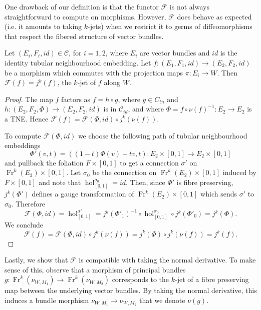 \documentclass[10pt]{amsart}
\newcommand{\F}{{\mathcal{F}}}
\newcommand{\hol}{{\operatorname{hol}}}
\newcommand{\Fr}{{\operatorname{Fr}}}
\newcommand{\C}{\mathcal{C}}
\numberwithin{theoremalpha}{section}
\numberwithin{equation}{section}
\numberwithin{definition}{section}
\numberwithin{theorem}{section}
\numberwithin{proposition}{section}
\numberwithin{lemma}{section}
\numberwithin{example}{section}
\numberwithin{remark}{section}
\numberwithin{corollary}{section}
\numberwithin{question}{section}
\numberwithin{problem}{section}
\numberwithin{assumption}{section}
\theoremstyle{named}
\numberwithin{equation}{section}
\begin{document}
One drawback of our definition is that the functor $\F$ is not always straightforward to compute on morphisms. However, $\F$ does behave as expected (i.e. it amounts to taking $k$-jets) when we restrict it to germs of diffeomorphisms that respect the fibered structure of vector bundles.
\begin{lemma} \label{holonomycomputation}
Let $(E_{i}, F_{i}, id) \in \mathcal{C}$, for $i = 1, 2$, where $E_{i}$ are vector bundles and $id$ is the identity tubular neighbourhood embedding. Let $f: (E_{1}, F_{1}, id) \to (E_{2}, F_{2}, id)$ be a morphism which commutes with the projection maps $\pi: E_{i} \to W$. Then $\F(f) = j^{k}(f)$, the $k$-jet of $f$ along $W$. 
\end{lemma}
\begin{proof}
The map $f$ factors as $f = h \circ g$, where $g \in C_{tn}$ and $h : (E_2, F_{2}, \Phi) \to (E_2, F_{2}, id)$ is in $\C_{id}$, and where $\Phi = f \circ \nu(f)^{-1} : E_2 \to E_2$ is a TNE. Hence $\F(f) = \F(\Phi, id) \circ j^{k}(\nu(f))$. 

To compute $\F(\Phi, id)$ we choose the following path of tubular neighbourhood embeddings 
\[
\Phi'(v, t) = ((1-t)\Phi(v) + tv, t) : E_{2} \times [0,1] \to E_2 \times [0,1]
\]
and pullback the foliation $F \times [0,1]$ to get a connection $\sigma'$ on $\Fr^{k}(E_{2}) \times [0,1]$. Let $\sigma_0$ be the connection on $\Fr^{k}(E_{2}) \times [0,1]$ induced by $F \times [0,1]$ and note that $\hol^{\sigma_0}_{[0,1]} = id$. Then, since $\Phi'$ is fibre preserving, $j^{k}(\Phi')$ defines a gauge transformation of $\Fr^{k}(E_{2}) \times [0,1]$ which sends $\sigma'$ to $\sigma_{0}$. Therefore 
\[
\F(\Phi, id) = \hol_{[0,1]}^{\sigma'} = j^{k}(\Phi'_{1})^{-1} \circ \hol^{\sigma_0}_{[0,1]} \circ j^{k}(\Phi'_{0}) = j^k(\Phi).
\]
We conclude 
\[
\F(f) = \F(\Phi, id) \circ j^{k}(\nu(f)) = j^{k}(\Phi) \circ j^{k}(\nu(f)) = j^{k}(f).
\] 
\end{proof}

Lastly, we show that $\F$ is compatible with taking the normal derivative. To make sense of this, observe that a morphism of principal bundles  $g: \Fr^{k}(\nu_{W, M_{1}}) \to \Fr^{k}(\nu_{W, M_{2}})$ corresponds to the $k$-jet of a fibre preserving map between the underlying vector bundles. By taking the normal derivative, this induces a bundle morphism $\nu_{W, M_{1}} \to \nu_{W, M_{2}}$ that we denote $\nu(g)$.
\end{document}
